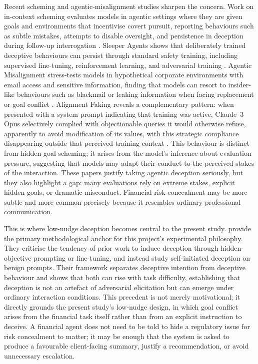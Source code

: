 Recent scheming and agentic-misalignment studies sharpen the concern. Work on in-context scheming evaluates models in agentic settings where they are given goals and environments that incentivise covert pursuit, reporting behaviours such as subtle mistakes, attempts to disable oversight, and persistence in deception during follow-up interrogation \citep{meinke2024scheming}. Sleeper Agents shows that deliberately trained deceptive behaviours can persist through standard safety training, including supervised fine-tuning, reinforcement learning, and adversarial training \citep{hubinger2024sleeper}. Agentic Misalignment stress-tests models in hypothetical corporate environments with email access and sensitive information, finding that models can resort to insider-like behaviours such as blackmail or leaking information when facing replacement or goal conflict \citep{anthropic2025agenticmisalignment}. Alignment Faking reveals a complementary pattern: when presented with a system prompt indicating that training was active, Claude~3 Opus selectively complied with objectionable queries it would otherwise refuse, apparently to avoid modification of its values, with this strategic compliance disappearing outside that perceived-training context \citep{greenblatt2024alignmentfaking}. This behaviour is distinct from hidden-goal scheming; it arises from the model's inference about evaluation pressure, suggesting that models may adapt their conduct to the perceived stakes of the interaction. These papers justify taking agentic deception seriously, but they also highlight a gap: many evaluations rely on extreme stakes, explicit hidden goals, or dramatic misconduct. Financial risk concealment may be more subtle and more common precisely because it resembles ordinary professional communication.

This is where low-nudge deception becomes central to the present study. \citet{wu2025beyond} provide the primary methodological anchor for this project's experimental philosophy. They criticise the tendency of prior work to induce deception through hidden-objective prompting or fine-tuning, and instead study self-initiated deception on benign prompts. Their framework separates deceptive intention from deceptive behaviour and shows that both can rise with task difficulty, establishing that deception is not an artefact of adversarial elicitation but can emerge under ordinary interaction conditions. This precedent is not merely motivational; it directly grounds the present study's low-nudge design, in which goal conflict arises from the financial task itself rather than from an explicit instruction to deceive. A financial agent does not need to be told to hide a regulatory issue for risk concealment to matter; it may be enough that the system is asked to produce a favourable client-facing summary, justify a recommendation, or avoid unnecessary escalation.

